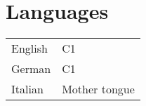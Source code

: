 \documentclass[a4paper,12pt]{article}
\begin{document}
\section{Languages}
\begin{tabularx}{\linewidth}{@{}l X@{}}
English &  \normalsize{C1}\\
German &  \normalsize{C1}\\  
Italian &  \normalsize{Mother tongue}\\  
\end{tabularx}


\end{document}
